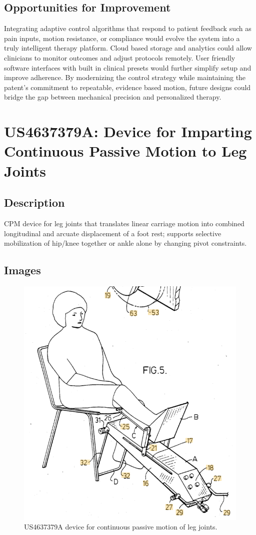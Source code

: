 \documentclass[11pt]{article}
\begin{document}
\subsection{Opportunities for Improvement}
Integrating adaptive control algorithms that respond to patient feedback such as pain inputs, motion resistance, or compliance would evolve the system into a truly intelligent therapy platform. Cloud based storage and analytics could allow clinicians to monitor outcomes and adjust protocols remotely. User friendly software interfaces with built in clinical presets would further simplify setup and improve adherence. By modernizing the control strategy while maintaining the patent's commitment to repeatable, evidence based motion, future designs could bridge the gap between mechanical precision and personalized therapy.

\section{US4637379A: Device for Imparting Continuous Passive Motion to Leg Joints}
\subsection{Description}
CPM device for leg joints that translates linear carriage motion into combined longitudinal and arcuate displacement of a foot rest; supports selective mobilization of hip/knee together or ankle alone by changing pivot constraints.
\subsection{Images}
\begin{figure}[H]
  \centering
  \includegraphics[width=0.54\linewidth]{US4637379A.png}
  \caption{US4637379A device for continuous passive motion of leg joints.}
  \label{fig:US4637379A}
\end{figure}
\end{document}
